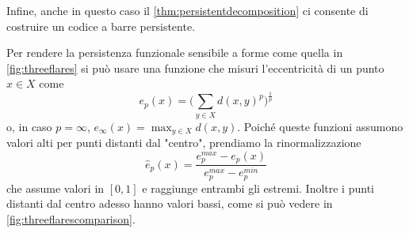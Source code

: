Infine, anche in questo caso il \cref{thm:persistentdecomposition} ci consente di costruire un codice a barre persistente.

Per rendere la persistenza funzionale sensibile a forme come quella in \cref{fig:threeflares} si può usare una funzione che misuri l'eccentricità di un punto $x\in X$ come
\begin{equation*}
  e_p(x) = \big(\sum_{y\in X} d(x,y)^p\big)^{\frac{1}{p}}
\end{equation*}
o, in caso $p=\infty$, $e_\infty(x) = \max_{y\in X}d(x,y)$. Poiché queste funzioni assumono valori alti per punti distanti dal "centro", prendiamo la rinormalizzazione
\begin{equation*}
  \hat{e}_p(x) = \frac{e_p^{max} - e_p(x)}{e_p^{max} - e_p^{min}}
\end{equation*}
che assume valori in $[0,1]$ e raggiunge entrambi gli estremi. Inoltre i punti distanti dal centro adesso hanno valori bassi, come si può vedere in \cref{fig:threeflarescomparison}.

